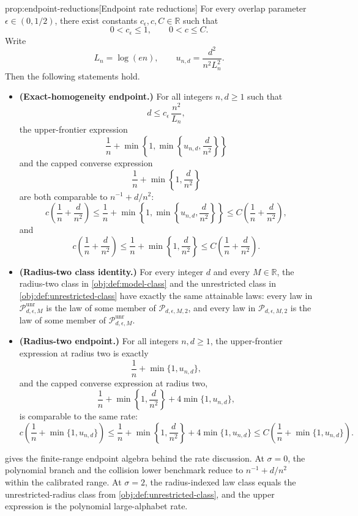 \documentclass[11pt]{article}
\begin{document}
\begin{propositionv}{prop:endpoint-reductions}[Endpoint rate reductions]
For every overlap parameter \(\epsilon\in(0,1/2)\), there exist constants \(c_\epsilon,c,C\in\mathbb R\) such that
\[
0<c_\epsilon\le 1,
\qquad
0<c\le C .
\]
Write
\[
L_n=\log(en),
\qquad
u_{n,d}=\frac{d^2}{n^2L_n^2}.
\]
Then the following statements hold.
\begin{itemize}
\item \textbf{(Exact-homogeneity endpoint.)} For all integers \(n,d\ge1\) such that
\[
d\le c_\epsilon\,\frac{n^2}{L_n},
\]
the upper-frontier expression
\[
\frac1n+\min\left\{1,\min\left\{u_{n,d},\frac d{n^2}\right\}\right\}
\]
and the capped converse expression
\[
\frac1n+\min\left\{1,\frac d{n^2}\right\}
\]
are both comparable to \(n^{-1}+d/n^2\):
\[
c\left(\frac1n+\frac d{n^2}\right)
\le
\frac1n+\min\left\{1,\min\left\{u_{n,d},\frac d{n^2}\right\}\right\}
\le
C\left(\frac1n+\frac d{n^2}\right),
\]
and
\[
c\left(\frac1n+\frac d{n^2}\right)
\le
\frac1n+\min\left\{1,\frac d{n^2}\right\}
\le
C\left(\frac1n+\frac d{n^2}\right).
\]
\item \textbf{(Radius-two class identity.)} For every integer \(d\) and every \(M\in\mathbb R\), the radius-two class in \cref{obj:def:model-class} and the unrestricted class in \cref{obj:def:unrestricted-class} have exactly the same attainable laws: every law in \(\mathcal P_{d,\epsilon,M}^{\mathrm{unr}}\) is the law of some member of \(\mathcal P_{d,\epsilon,M,2}\), and every law in \(\mathcal P_{d,\epsilon,M,2}\) is the law of some member of \(\mathcal P_{d,\epsilon,M}^{\mathrm{unr}}\).
\item \textbf{(Radius-two endpoint.)} For all integers \(n,d\ge1\), the upper-frontier expression at radius two is exactly
\[
\frac1n+\min\{1,u_{n,d}\},
\]
and the capped converse expression at radius two,
\[
\frac1n+\min\left\{1,\frac d{n^2}\right\}+4\min\{1,u_{n,d}\},
\]
is comparable to the same rate:
\[
c\left(\frac1n+\min\{1,u_{n,d}\}\right)
\le
\frac1n+\min\left\{1,\frac d{n^2}\right\}+4\min\{1,u_{n,d}\}
\le
C\left(\frac1n+\min\{1,u_{n,d}\}\right).
\]
\end{itemize}
\end{propositionv}

 gives the finite-range endpoint algebra behind the rate discussion. At \(\sigma=0\), the polynomial branch and the collision lower benchmark reduce to \(n^{-1}+d/n^2\) within the calibrated range. At \(\sigma=2\), the radius-indexed law class equals the unrestricted-radius class from \cref{obj:def:unrestricted-class}, and the upper expression is the polynomial large-alphabet rate.
\end{document}
